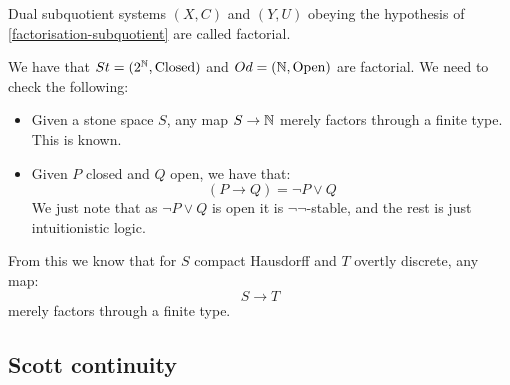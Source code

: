 \begin{definition}
Dual subquotient systems $(X,C)$ and $(Y,U)$ obeying the hypothesis of \cref{factorisation-subquotient} are called factorial.
\end{definition}

\begin{remark}
We have that $St = (2^{\mathbb{N}},\mathrm{Closed})$ and $Od = (\mathbb{N},\mathrm{Open})$ are factorial. We need to check the following:
\begin{itemize}
\item Given a stone space $S$, any map $S\to\mathbb{N}$ merely factors through a finite type. This is known.
\item Given $P$ closed and $Q$ open, we have that:
\[(P\to Q) = \neg P \lor Q\]
We just note that as $\neg P \lor Q$ is open it is $\neg\neg$-stable, and the rest is just intuitionistic logic.
\end{itemize}
From this we know that for $S$ compact Hausdorff and $T$ overtly discrete, any map:
\[S\to T\]
merely factors through a finite type. 
\end{remark}

\subsection{Scott continuity}



